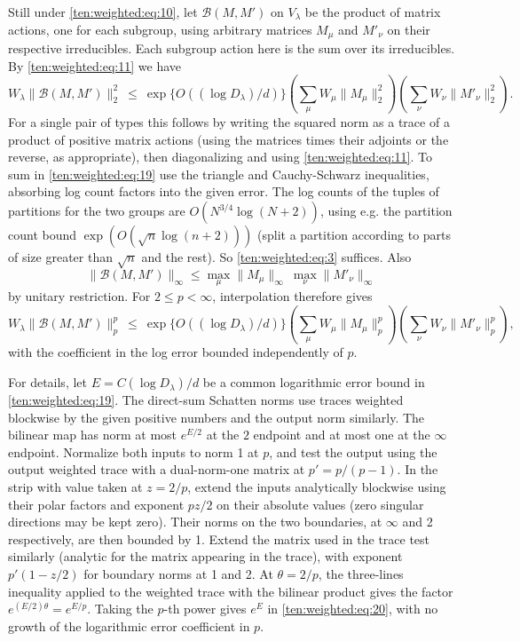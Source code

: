 Still under \eqref{ten:weighted:eq:10}, let \(\mathcal B(M,M')\) on \(V_\lambda\) be the product of matrix actions, one for each subgroup, using arbitrary matrices \(M_\mu\) and \(M'_\nu\) on their respective irreducibles. Each subgroup action here is the sum over its irreducibles. By \eqref{ten:weighted:eq:11} we have
\begin{equation}
 W_\lambda \|\mathcal B(M,M')\|_2^2
 \ \le\ \exp\{O((\log D_\lambda)/d)\}
 \left(\sum_\mu W_\mu\|M_\mu\|_2^2\right)\left(\sum_\nu W_\nu\|M'_\nu\|_2^2\right).          \label{ten:weighted:eq:19}
\end{equation}
For a single pair of types this follows by writing the squared norm as a trace of a product of positive matrix actions (using the matrices times their adjoints or the reverse, as appropriate), then diagonalizing and using \eqref{ten:weighted:eq:11}. To sum in \eqref{ten:weighted:eq:19} use the triangle and Cauchy-Schwarz inequalities, absorbing log count factors into the given error. The log counts of the tuples of partitions for the two groups are \(O(N^{3/4}\log(N+2))\), using e.g. the partition count bound \(\exp(O(\sqrt n\log(n+2)))\) (split a partition according to parts of size greater than \(\sqrt n\) and the rest). So \eqref{ten:weighted:eq:3} suffices. Also
\[
 \|\mathcal B(M,M')\|_\infty\le \max_\mu\|M_\mu\|_\infty\ \max_\nu\|M'_\nu\|_\infty
\]
by unitary restriction. For \(2\le p<\infty\), interpolation therefore gives
\begin{equation}
 W_\lambda \|\mathcal B(M,M')\|_p^p
 \ \le\ \exp\{O((\log D_\lambda)/d)\}
 \left(\sum_\mu W_\mu\|M_\mu\|_p^p\right)\left(\sum_\nu W_\nu\|M'_\nu\|_p^p\right),          \label{ten:weighted:eq:20}
\end{equation}
with the coefficient in the log error bounded independently of \(p\).

For details, let $E=C(\log D_\lambda)/d$ be a common logarithmic error bound in \eqref{ten:weighted:eq:19}. The direct-sum Schatten norms use traces weighted blockwise by the given positive numbers and the output norm similarly. The bilinear map has norm at most $e^{E/2}$ at the $2$ endpoint and at most one at the $\infty$ endpoint. Normalize both inputs to norm 1 at \(p\), and test the output using the output weighted trace with a dual-norm-one matrix at \(p'=p/(p-1)\). In the strip with value taken at \(z=2/p\), extend the inputs analytically blockwise using their polar factors and exponent \(p z/2\) on their absolute values (zero singular directions may be kept zero). Their norms on the two boundaries, at \(\infty\) and 2 respectively, are then bounded by 1. Extend the matrix used in the trace test similarly (analytic for the matrix appearing in the trace), with exponent \(p'(1-z/2)\) for boundary norms at 1 and 2. At $\theta=2/p$, the three-lines inequality applied to the weighted trace with the bilinear product gives the factor $e^{(E/2)\theta}=e^{E/p}$. Taking the $p$-th power gives $e^E$ in \eqref{ten:weighted:eq:20}, with no growth of the logarithmic error coefficient in $p$.


